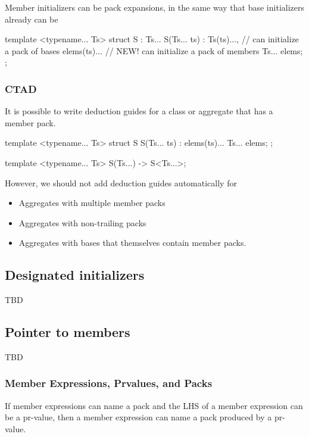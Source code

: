 \documentclass{wg21}
\begin{document}
Member initializers can be pack expansions, in the same way that base initializers already can be

\begin{colorblock}
template <typename... Ts>
struct S : Ts... {
    S(Ts... ts) :
        Ts(ts)...,   // can initialize a pack of bases
        elems(ts)... {}   // NEW! can initialize a pack of members
         {}
    Ts... elems;
};
\end{colorblock}

\subsubsection{CTAD}

It is possible to write deduction guides for a class
or aggregate that has a member pack.

\begin{colorblock}
template <typename... Ts>
struct S {
    S(Ts... ts) : elems(ts)... {}
    Ts... elems;
};

template <typename... Ts>
S(Ts...) -> S<Ts...>;
\end{colorblock}

However, we should not add deduction guides automatically for

\begin{itemize}
\item Aggregates with multiple member packs
\item Aggregates with non-trailing packs
\item Aggregates with bases that themselves contain member packs.
\end{itemize}

\subsection{Designated initializers}

TBD


\subsection{Pointer to members}

TBD


\subsubsection{Member Expressions, Prvalues, and Packs}

If member expressions can name a pack and the LHS of a member expression
can be a pr-value, then a member expression can name a pack produced by a pr-value.
\end{document}
